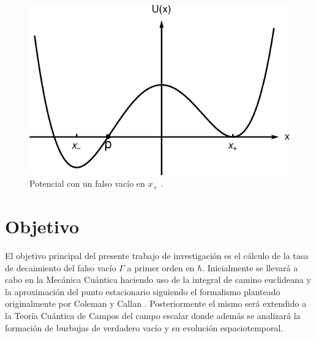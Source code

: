 \begin{figure}[h!]
	\centering
	\includegraphics[scale = 0.4]{../FIGURAS/potencial}
	\caption{Potencial con un falso vacío en $x_+$ \cite{Ai:2019dqr}.}
	\label{fig:potencial}
\end{figure}

\section{Objetivo}

El objetivo principal del presente trabajo de investigación es el cálculo de la tasa de decaimiento del falso vacío $\Gamma$ a primer orden en $\hbar$. 
Inicialmente se llevará a cabo en la Mecánica Cuántica haciendo uso de la integral de camino euclideana y la aproximación del punto estacionario siguiendo el formalismo planteado originalmente por Coleman y Callan \cite{coleman1977fate, callan1977fate}. %
Posteriormente el mismo será extendido a la Teoría Cuántica de Campos del campo escalar donde además se analizará la formación de burbujas de verdadero vacío y su evolución espaciotemporal. 




%	
%	
%	
%	
%	







